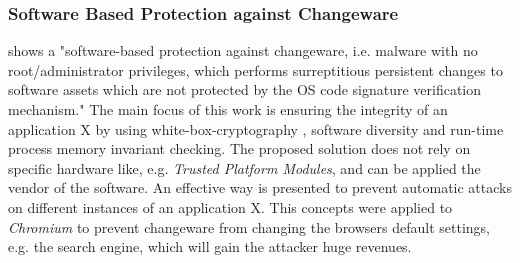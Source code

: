 \subsubsection{Software Based Protection against Changeware}
\cite{changeware} shows a "software-based protection against changeware, i.e. malware with no root/administrator privileges, which performs surreptitious persistent changes to software assets which are not protected by the OS code signature verification mechanism." The main focus of this work is ensuring the integrity of an application X by using white-box-cryptography \cite{wbcrypto}, software diversity \cite{Forrest} and run-time process memory invariant checking. The proposed solution does not rely on specific hardware like, e.g. \emph{Trusted Platform Modules}, and can be applied the vendor of the software. An effective way is presented to prevent automatic attacks on different instances of an application X. This concepts were applied to \emph{Chromium} to prevent changeware from changing the browsers default settings, e.g. the search engine, which will gain the attacker huge revenues. 